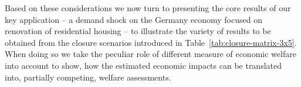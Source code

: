 Based on these considerations we now turn to presenting the core results of our key application -- a demand shock on the Germany economy focused on renovation of residential housing -- to illustrate the variety of results to be obtained from the closure scenarios introduced in Table~\ref{tab:closure-matrix-3x5}. When doing so we take the peculiar role of different measure of economic welfare into account to show, how the estimated economic impacts can be translated into, partially competing, welfare assessments.



